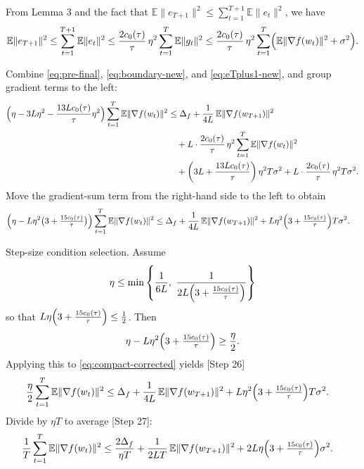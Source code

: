 \documentclass[11pt]{article}
\newcommand{\E}{\mathbb{E}}
\begin{document}
From Lemma 3 and the fact that $\E\|e_{T+1}\|^2 \le \sum_{t=1}^{T+1}\E\|e_t\|^2$, we have
\begin{align}
\E\|e_{T+1}\|^2 \le \sum_{t=1}^{T+1}\E\|e_t\|^2
\le \frac{2 c_0(\tau)}{\tau}\,\eta^2 \sum_{t=1}^{T} \E\|g_t\|^2
\le \frac{2 c_0(\tau)}{\tau}\,\eta^2 \sum_{t=1}^{T} \Bigl(\E\|\nabla f(w_t)\|^2 + \sigma^2\Bigr). \label{eq:eTplus1-new}
\end{align}

Combine \eqref{eq:pre-final}, \eqref{eq:boundary-new}, and \eqref{eq:eTplus1-new}, and group gradient terms to the left:
\begin{align}
\Bigl(\eta - 3L\eta^2 - \frac{13L c_0(\tau)}{\tau}\eta^2\Bigr) \sum_{t=1}^T \E\|\nabla f(w_t)\|^2
&\le \Delta_f + \frac{1}{4L}\,\E\|\nabla f(w_{T+1})\|^2 \nonumber\\
&\quad + L\cdot \frac{2 c_0(\tau)}{\tau}\,\eta^2 \sum_{t=1}^{T} \E\|\nabla f(w_t)\|^2 \nonumber\\
&\quad + \left(3L + \frac{13L c_0(\tau)}{\tau}\right)\eta^2 T \sigma^2
+ L\cdot \frac{2 c_0(\tau)}{\tau}\,\eta^2 T \sigma^2. \label{eq:almost-final-new}
\end{align}
Move the gradient-sum term from the right-hand side to the left to obtain
\begin{align}
\Bigl(\eta - L\eta^2\bigl(3 + \tfrac{15 c_0(\tau)}{\tau}\bigr)\Bigr) \sum_{t=1}^T \E\|\nabla f(w_t)\|^2
&\le \Delta_f + \frac{1}{4L}\,\E\|\nabla f(w_{T+1})\|^2 
+ L\eta^2\Bigl(3 + \tfrac{15 c_0(\tau)}{\tau}\Bigr) T \sigma^2.
\label{eq:compact-corrected}
\end{align}

Step-size condition selection. Assume
\[
\eta \le \min\left\{\frac{1}{6L},\ \frac{1}{2L\Bigl(3 + \frac{15 c_0(\tau)}{\tau}\Bigr)}\right\}
\]
so that $L\eta\Bigl(3 + \frac{15 c_0(\tau)}{\tau}\Bigr) \le \frac12$. Then
\[
\eta - L\eta^2\Bigl(3 + \tfrac{15 c_0(\tau)}{\tau}\Bigr) \ge \frac{\eta}{2}.
\]
Applying this to \eqref{eq:compact-corrected} yields [Step 26]
\begin{align}
\frac{\eta}{2}\sum_{t=1}^T \E\|\nabla f(w_t)\|^2
&\le \Delta_f + \frac{1}{4L}\,\E\|\nabla f(w_{T+1})\|^2 
+ L\eta^2\Bigl(3 + \tfrac{15 c_0(\tau)}{\tau}\Bigr) T \sigma^2. \label{eq:pre-average-corrected}
\end{align}
Divide by $\eta T$ to average [Step 27]:
\begin{align}
\frac{1}{T}\sum_{t=1}^T \E\|\nabla f(w_t)\|^2
&\le \frac{2\Delta_f}{\eta T} + \frac{1}{2LT}\,\E\|\nabla f(w_{T+1})\|^2 
+ 2L\eta\Bigl(3 + \tfrac{15 c_0(\tau)}{\tau}\Bigr) \sigma^2. \label{eq:avg-grad-corrected}
\end{align}
\end{document}
